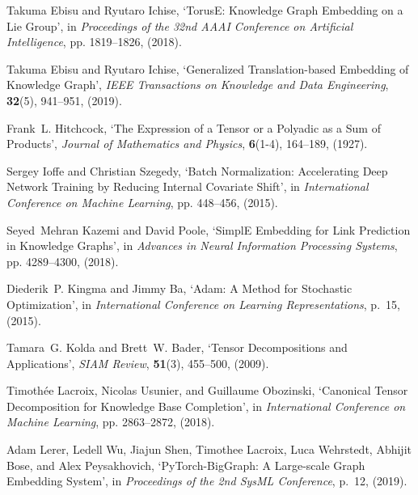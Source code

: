 \documentclass{ecai}
\theoremstyle{plain}  \newtheorem{thm}{Theorem}  \newtheorem{lem}[thm]{Lemma}  \newtheorem{prop}[thm]{Proposition}
\theoremstyle{remark}  \newtheorem*{rem}{Remark}
\begin{document}
\begin{thebibliography}{10}
Takuma Ebisu and Ryutaro Ichise, `{{TorusE}}: {{Knowledge Graph Embedding}} on
  a {{Lie Group}}', in {\em Proceedings of the 32nd {{AAAI Conference}} on
  {{Artificial Intelligence}}}, pp. 1819--1826, (2018).

Takuma Ebisu and Ryutaro Ichise, `Generalized {{Translation-based Embedding}}
  of {{Knowledge Graph}}', {\em IEEE Transactions on Knowledge and Data
  Engineering}, {\bf 32}(5),  941--951, (2019).

Frank~L. Hitchcock, `The {{Expression}} of a {{Tensor}} or a {{Polyadic}} as a
  {{Sum}} of {{Products}}', {\em Journal of Mathematics and Physics}, {\bf
  6}(1-4),  164--189, (1927).

Sergey Ioffe and Christian Szegedy, `Batch {{Normalization}}: {{Accelerating
  Deep Network Training}} by {{Reducing Internal Covariate Shift}}', in {\em
  International {{Conference}} on {{Machine Learning}}}, pp. 448--456, (2015).

Seyed~Mehran Kazemi and David Poole, `{{SimplE Embedding}} for {{Link
  Prediction}} in {{Knowledge Graphs}}', in {\em Advances in {{Neural
  Information Processing Systems}}}, pp. 4289--4300, (2018).

Diederik~P. Kingma and Jimmy Ba, `Adam: {{A Method}} for {{Stochastic
  Optimization}}', in {\em International {{Conference}} on {{Learning
  Representations}}}, p.~15, (2015).

Tamara~G. Kolda and Brett~W. Bader, `Tensor {{Decompositions}} and
  {{Applications}}', {\em SIAM Review}, {\bf 51}(3),  455--500, (2009).

Timoth{\'e}e Lacroix, Nicolas Usunier, and Guillaume Obozinski, `Canonical
  {{Tensor Decomposition}} for {{Knowledge Base Completion}}', in {\em
  International {{Conference}} on {{Machine Learning}}}, pp. 2863--2872,
  (2018).

Adam Lerer, Ledell Wu, Jiajun Shen, Timothee Lacroix, Luca Wehrstedt, Abhijit
  Bose, and Alex Peysakhovich, `{{PyTorch-BigGraph}}: {{A Large-scale Graph
  Embedding System}}', in {\em Proceedings of the 2nd {{SysML Conference}}},
  p.~12, (2019).


\end{thebibliography}
\end{document}
